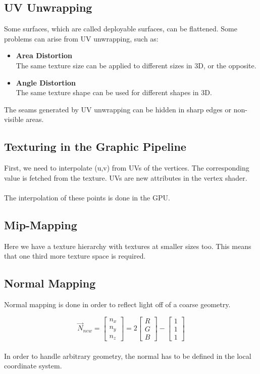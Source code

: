 \documentclass{article}
\begin{document}
\subsection{UV Unwrapping}
Some surfaces, which are called deployable surfaces, can be flattened. Some problems can arise from UV unwrapping, such as:

\begin{itemize}
	\item \textbf{Area Distortion}
	\vspace{.2cm} \\
	The same texture size can be applied to different sizes in 3D, or the opposite.
	
	\item \textbf{Angle Distortion}
	\vspace{.2cm} \\
	The same texture shape can be used for different shapes in 3D.
\end{itemize}
The seams generated by UV unwrapping can be hidden in sharp edges or non-visible areas.

\subsection{Texturing in the Graphic Pipeline}
First, we need to interpolate (u,v) from UVs of the vertices. The corresponding value is fetched from the texture. UVs are new attributes in the vertex shader. \\ \\
The interpolation of these points is done in the GPU.

\subsection{Mip-Mapping}
Here we have a texture hierarchy with textures at smaller sizes too. This means that one third more texture space is required.

\subsection{Normal Mapping}
Normal mapping is done in order to reflect light off of a coarse geometry.

\[ \overrightarrow{N}_{new} = \begin{bmatrix} n_x \\ n_y \\ n_z \end{bmatrix} = 2 \begin{bmatrix} R \\ G \\ B \end{bmatrix} - \begin{bmatrix} 1 \\ 1 \\ 1 \end{bmatrix} \] \\
In order to handle arbitrary geometry, the normal has to be defined in the local coordinate system.
\end{document}
